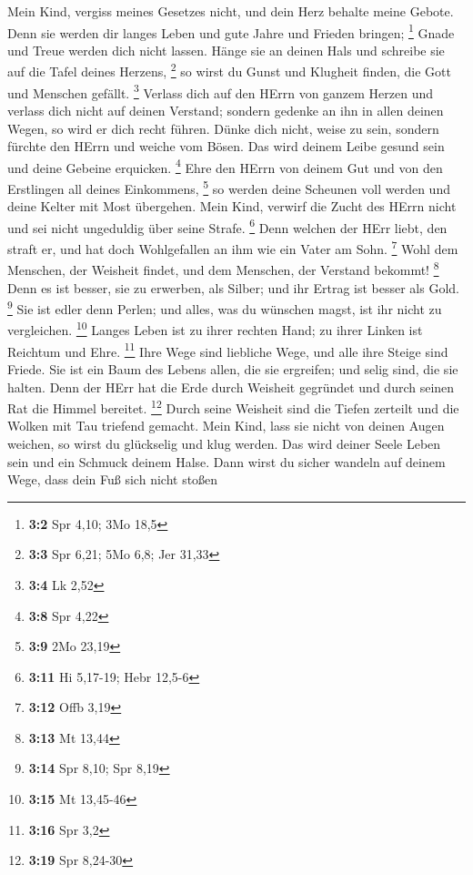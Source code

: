  Mein Kind, vergiss meines Gesetzes nicht, und dein Herz
behalte meine Gebote.  Denn sie werden dir langes Leben und
gute Jahre und Frieden bringen; \footnote{\textbf{3:2} Spr 4,10; 3Mo
  18,5}  Gnade und Treue werden dich nicht lassen. Hänge sie
an deinen Hals und schreibe sie auf die Tafel deines Herzens,
\footnote{\textbf{3:3} Spr 6,21; 5Mo 6,8; Jer 31,33}  so
wirst du Gunst und Klugheit finden, die Gott und Menschen gefällt.
\footnote{\textbf{3:4} Lk 2,52}  Verlass dich auf den HErrn
von ganzem Herzen und verlass dich nicht auf deinen Verstand;
 sondern gedenke an ihn in allen deinen Wegen, so wird er
dich recht führen.  Dünke dich nicht, weise zu sein, sondern
fürchte den HErrn und weiche vom Bösen.  Das wird deinem
Leibe gesund sein und deine Gebeine erquicken. \footnote{\textbf{3:8}
  Spr 4,22}  Ehre den HErrn von deinem Gut und von den
Erstlingen all deines Einkommens, \footnote{\textbf{3:9} 2Mo 23,19}
 so werden deine Scheunen voll werden und deine Kelter mit
Most übergehen.  Mein Kind, verwirf die Zucht des HErrn
nicht und sei nicht ungeduldig über seine Strafe. \footnote{\textbf{3:11}
  Hi 5,17-19; Hebr 12,5-6}  Denn welchen der HErr liebt,
den straft er, und hat doch Wohlgefallen an ihm wie ein Vater am Sohn.
\footnote{\textbf{3:12} Offb 3,19}  Wohl dem Menschen, der
Weisheit findet, und dem Menschen, der Verstand bekommt! \footnote{\textbf{3:13}
  Mt 13,44}  Denn es ist besser, sie zu erwerben, als
Silber; und ihr Ertrag ist besser als Gold. \footnote{\textbf{3:14} Spr
  8,10; Spr 8,19}  Sie ist edler denn Perlen; und alles,
was du wünschen magst, ist ihr nicht zu vergleichen. \footnote{\textbf{3:15}
  Mt 13,45-46}  Langes Leben ist zu ihrer rechten Hand; zu
ihrer Linken ist Reichtum und Ehre. \footnote{\textbf{3:16} Spr 3,2}
 Ihre Wege sind liebliche Wege, und alle ihre Steige sind
Friede.  Sie ist ein Baum des Lebens allen, die sie
ergreifen; und selig sind, die sie halten.  Denn der HErr
hat die Erde durch Weisheit gegründet und durch seinen Rat die Himmel
bereitet. \footnote{\textbf{3:19} Spr 8,24-30}  Durch seine
Weisheit sind die Tiefen zerteilt und die Wolken mit Tau triefend
gemacht.  Mein Kind, lass sie nicht von deinen Augen
weichen, so wirst du glückselig und klug werden.  Das wird
deiner Seele Leben sein und ein Schmuck deinem Halse.  Dann
wirst du sicher wandeln auf deinem Wege, dass dein Fuß sich nicht stoßen
